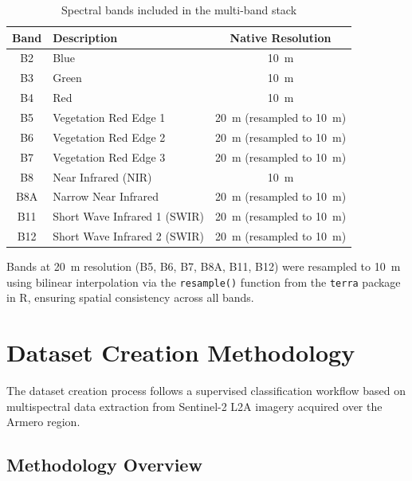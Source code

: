 \documentclass[12pt,a4paper]{article}
\begin{document}
\begin{table}[H]
\centering
\begin{tabular}{|c|m{6cm}|c|}
\hline
\textbf{Band} & \textbf{Description} & \textbf{Native Resolution} \\
\hline
B2  & Blue                        & 10~m \\
\hline
B3  & Green                       & 10~m \\
\hline
B4  & Red                         & 10~m \\
\hline
B5  & Vegetation Red Edge 1       & 20~m (resampled to 10~m) \\
\hline
B6  & Vegetation Red Edge 2       & 20~m (resampled to 10~m) \\
\hline
B7  & Vegetation Red Edge 3       & 20~m (resampled to 10~m) \\
\hline
B8  & Near Infrared (NIR)         & 10~m \\
\hline
B8A & Narrow Near Infrared        & 20~m (resampled to 10~m) \\
\hline
B11 & Short Wave Infrared 1 (SWIR) & 20~m (resampled to 10~m) \\
\hline
B12 & Short Wave Infrared 2 (SWIR) & 20~m (resampled to 10~m) \\
\hline
\end{tabular}
\caption{Spectral bands included in the multi-band stack}
\end{table}

Bands at 20~m resolution (B5, B6, B7, B8A, B11, B12) were resampled to 10~m using bilinear interpolation via the \texttt{resample()} function from the \texttt{terra} package in R, ensuring spatial consistency across all bands.

\section{Dataset Creation Methodology}

The dataset creation process follows a supervised classification workflow based on multispectral data extraction from Sentinel-2 L2A imagery acquired over the Armero region.

\subsection{Methodology Overview}
\end{document}
